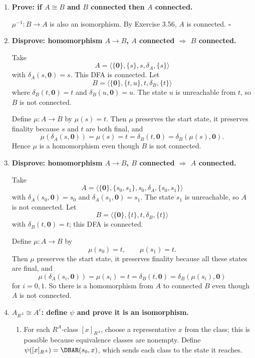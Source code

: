\begin{enumerate}[{3.}1.]
\item \textbf{Prove: if $A\cong B$ and $B$ connected then $A$ connected.}

$\mu^{-1}: B\to A$ is also an isomorphism. By Exercise 3.56, $A$ is connected. $\square$

\item \textbf{Disprove: homomorphism $A\to B$, $A$ connected $\Rightarrow$ $B$ connected.}

Take
\[
A=\langle\{\pmb{0}\},\{s\},s,\delta_A,\{s\}\rangle
\]
with $\delta_A(s,\pmb{0})=s$. This DFA is connected. Let
\[
B=\langle\{\pmb{0}\},\{t,u\},t,\delta_B,\{t\}\rangle
\]
where $\delta_B(t,\pmb{0})=t$ and $\delta_B(u,\pmb{0})=u$. The state $u$ is
unreachable from $t$, so $B$ is not connected.

Define $\mu:A\to B$ by $\mu(s)=t$. Then $\mu$ preserves the start state, it
preserves finality because $s$ and $t$ are both final, and
\[
\mu(\delta_A(s,\pmb{0}))=\mu(s)=t=\delta_B(t,\pmb{0})
=\delta_B(\mu(s),\pmb{0}).
\]
Hence $\mu$ is a homomorphism even though $B$ is not connected.

\item \textbf{Disprove: homomorphism $A\to B$, $B$ connected $\Rightarrow$ $A$ connected.}

Take
\[
A=\langle\{\pmb{0}\},\{s_0,s_1\},s_0,\delta_A,\{s_0,s_1\}\rangle
\]
with $\delta_A(s_0,\pmb{0})=s_0$ and $\delta_A(s_1,\pmb{0})=s_1$. The state $s_1$
is unreachable, so $A$ is not connected. Let
\[
B=\langle\{\pmb{0}\},\{t\},t,\delta_B,\{t\}\rangle
\]
with $\delta_B(t,\pmb{0})=t$; this DFA is connected.

Define $\mu:A\to B$ by
\[
\mu(s_0)=t,\qquad \mu(s_1)=t.
\]
Then $\mu$ preserves the start state, it preserves finality because all these
states are final, and
\[
\mu(\delta_A(s_i,\pmb{0}))=\mu(s_i)=t=\delta_B(t,\pmb{0})
=\delta_B(\mu(s_i),\pmb{0})
\]
for $i=0,1$. So there is a homomorphism from $A$ to connected $B$ even though
$A$ is not connected.

\item \textbf{$A_{R^A}\cong A^c$: define $\psi$ and prove it is an isomorphism.}

\begin{enumerate}
\item For each $R^A$-class $[x]_{R^A}$, choose a representative $x$ from the class; this is possible because equivalence classes are nonempty. Define $\psi([x]_{R^A})=\DBAR(s_0,x)$, which sends each class to the state it reaches.


\end{enumerate}
\end{enumerate}
